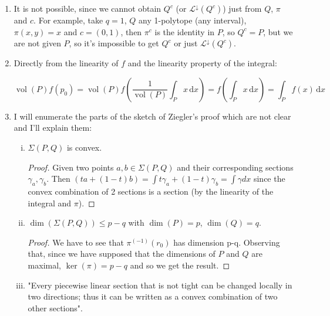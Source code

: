 \documentclass[11pt]{article}
\DeclareMathOperator{\vol}{vol}
\begin{document}
\begin{enumerate}

\item It is not possible, since we cannot obtain $Q^c$ (or $\mathcal L^\downarrow(Q^c)$) just from $Q$, $\pi$ and $c$. \newline For example, take $q = 1$, $Q$ any 1-polytope (any interval), $\pi(x,y) = x$ and $c = (0,1)$, then $\pi^c$ is the identity in $P$, so $Q^c = P$, but we are not given $P$, so it's impossible to get $Q^c$ or just $\mathcal L^\downarrow(Q^c)$.

\item Directly from the linearity of $f$ and the linearity property of the integral:

\begin{equation*}
	\vol(P) f(p_0)
	= \vol(P) f\left( \frac1{\vol (P)}\int_P x\,\mathrm{d}x \right)
	= f\left(\int_P x\,\mathrm{d}x \right) 
	= \int_P f(x) \,\mathrm{d}x
\end{equation*}

\item I will enumerate the parts of the sketch of Ziegler's proof which are not clear and I'll explain them:

\begin{enumerate}[(i)]

\item $\Sigma(P,Q)$ is convex.

\begin{proof}
Given two points $a,b \in \Sigma(P,Q)$ and their corresponding sections $\gamma_a, \gamma_b$. Then $(ta + (1-t)b) = \int t\gamma_a + (1-t)\gamma_b = \int \gamma dx$ since the convex combination of 2 sections is a section (by the linearity of the integral and $\pi$).
\end{proof}

\item $\dim(\Sigma(P,Q)) \leq p-q$ with $\dim(P) = p$, $\dim(Q) = q$.

\begin{proof}
We have to see that $\pi^{(-1)}(r_0)$ has dimension p-q. Observing that, since we have supposed that the dimensions of $P$ and $Q$ are maximal, $\ker(\pi) = p - q$ and so we get the result.
\end{proof}



\item "Every piecewise linear section that is not tight can be changed locally in two directions; thus it can be written as a convex combination of two other sections".


\end{enumerate}
\end{enumerate}
\end{document}
